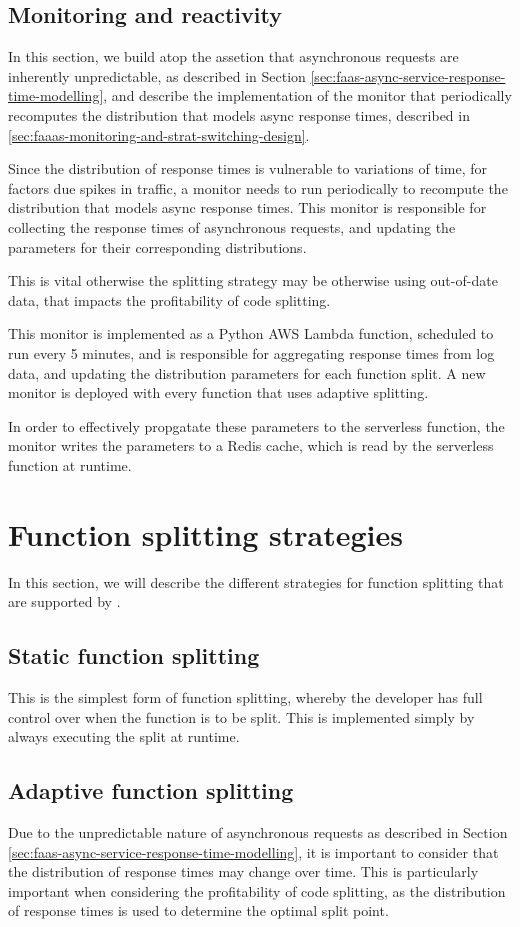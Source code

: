 \subsection{Monitoring and reactivity}
In this section, we build atop the assetion that asynchronous requests are inherently unpredictable, as described in Section \ref{sec:faas-async-service-response-time-modelling}, and describe the implementation of the monitor that periodically recomputes the distribution that models async response times, described in \ref{sec:faaas-monitoring-and-strat-switching-design}.

Since the distribution of response times is vulnerable to variations of time, for factors due spikes in traffic, a monitor needs to run periodically to recompute the distribution that models async response times. This monitor is responsible for collecting the response times of asynchronous requests, and updating the parameters for their corresponding distributions.

This is vital otherwise the splitting strategy may be otherwise using out-of-date data, that impacts the profitability of code splitting.

This monitor is implemented as a Python AWS Lambda function, scheduled to run every 5 minutes, and is responsible for aggregating response times from log data, and updating the distribution parameters for each function split. A new monitor is deployed with every function that uses adaptive splitting.

In order to effectively propgatate these parameters to the serverless function, the monitor writes the parameters to a Redis cache, which is read by the serverless function at runtime.

\section{Function splitting strategies}
In this section, we will describe the different strategies for function splitting that are supported by \faaas{}.

\subsection{Static function splitting}
This is the simplest form of function splitting, whereby the developer has full control over when the function is to be split. This is implemented simply by always executing the split at runtime.

\subsection{Adaptive function splitting}
Due to the unpredictable nature of asynchronous requests as described in Section \ref{sec:faas-async-service-response-time-modelling}, it is important to consider that the distribution of response times may change over time. This is particularly important when considering the profitability of code splitting, as the distribution of response times is used to determine the optimal split point.

